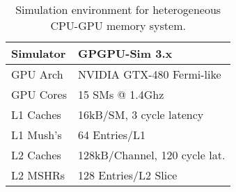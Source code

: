 \begin{table}[t]
\begin{center}
\begin{tabular}{|l|l|}
\hline
Simulator & GPGPU-Sim 3.x\\
\hline
GPU Arch & NVIDIA GTX-480 Fermi-like\\
\hline
GPU Cores& 15 {\color{black}SMs} @ 1.4Ghz\\
\hline
L1 Caches & 16kB/SM, 3 cycle latency \\
\hline
L1 Mush's & 64 Entries/L1\\
\hline
L2 Caches & 128kB/Channel, 120 cycle lat.\\
\hline
L2 MSHRs & 128 Entries/L2 Slice\\
\hline
\end{tabular}
\caption{Simulation environment for heterogeneous CPU-GPU memory system.}
\label{tab:methodology-basic}
\end{center}
\vspace{-0.15in}
\end{table}

